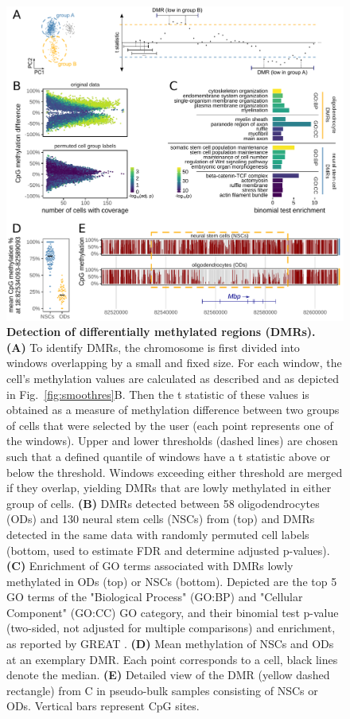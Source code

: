 \documentclass[10pt]{article}
\begin{document}
\begin{figure}[p]
	\begin{center}
		\includegraphics[width=.8\textwidth]{figures/Fig_DMRs.pdf}
	\end{center}
	\caption{\small \textbf{Detection of differentially methylated regions (DMRs).}\\
		\textbf{(A)} To identify DMRs, the chromosome is first divided into windows overlapping by a small and fixed size.
		For each window, the cell’s methylation values are calculated as described and as depicted in Fig.~\ref{fig:smoothres}B.
		Then the t statistic of these values is obtained as a measure of methylation difference between two groups of cells that were selected by the user (each point represents one of the windows).
		Upper and lower thresholds (dashed lines) are chosen such that a defined quantile of windows have a t statistic above or below the threshold.
		Windows exceeding either threshold are merged if they overlap, yielding DMRs that are lowly methylated in either group of cells.
		\textbf{(B)} DMRs detected between 58 oligodendrocytes (ODs) and 130 neural stem cells (NSCs) from \citet{kremer_scnmt} (top) and DMRs detected in the same data with randomly permuted cell labels (bottom, used to estimate FDR and determine adjusted p-values).
		\textbf{(C)} Enrichment of GO terms associated with DMRs lowly methylated in ODs (top) or NSCs (bottom).
		Depicted are the top 5 GO terms of the "Biological Process" (GO:BP) and "Cellular Component" (GO:CC) GO category, and their binomial test p-value (two-sided, not adjusted for multiple comparisons) and enrichment, as reported by GREAT \citep{mclean2010great}.
		\textbf{(D)} Mean methylation of NSCs and ODs at an exemplary DMR.
		Each point corresponds to a cell, black lines denote the median.
		\textbf{(E)} Detailed view of the DMR (yellow dashed rectangle) from C in pseudo-bulk samples consisting of NSCs or ODs.
		Vertical bars represent CpG sites.
	}
	\label{fig:dmr}
\end{figure}
\end{document}
